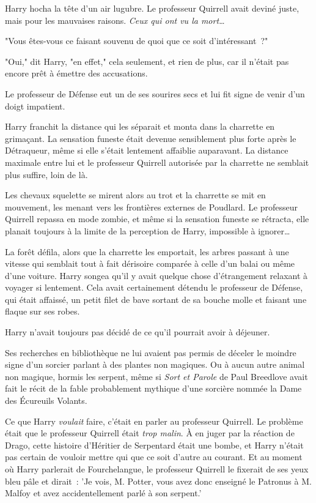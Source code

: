 Harry hocha la tête d'un air lugubre. Le professeur Quirrell avait deviné juste, mais pour les mauvaises raisons. \emph{Ceux qui ont vu la mort…}

"Vous êtes-vous ce faisant souvenu de quoi que ce soit d'intéressant~?"

"Oui," dit Harry, "en effet," cela seulement, et rien de plus, car il n'était pas encore prêt à émettre des accusations.

Le professeur de Défense eut un de ses sourires secs et lui fit signe de venir d'un doigt impatient.

Harry franchit la distance qui les séparait et monta dans la charrette en grimaçant. La sensation funeste était devenue sensiblement plus forte après le Détraqueur, même si elle s'était lentement affaiblie auparavant. La distance maximale entre lui et le professeur Quirrell autorisée par la charrette ne semblait plus suffire, loin de là.

Les chevaux squelette se mirent alors au trot et la charrette se mit en mouvement, les menant vers les frontières externes de Poudlard. Le professeur Quirrell repassa en mode zombie, et même si la sensation funeste se rétracta, elle planait toujours à la limite de la perception de Harry, impossible à ignorer…

La forêt défila, alors que la charrette les emportait, les arbres passant à une vitesse qui semblait tout à fait dérisoire comparée à celle d'un balai ou même d'une voiture. Harry songea qu'il y avait quelque chose d'étrangement relaxant à voyager si lentement. Cela avait certainement détendu le professeur de Défense, qui était affaissé, un petit filet de bave sortant de sa bouche molle et faisant une flaque sur ses robes.

Harry n'avait toujours pas décidé de ce qu'il pourrait avoir à déjeuner.

Ses recherches en bibliothèque ne lui avaient pas permis de déceler le moindre signe d'un sorcier parlant à des plantes non magiques. Ou à aucun autre animal non magique, hormis les serpent, même si \emph{Sort et Parole} de Paul Breedlove avait fait le récit de la fable probablement mythique d'une sorcière nommée la Dame des Écureuils Volants.

Ce que Harry \emph{voulait} faire, c'était en parler au professeur Quirrell. Le problème était que le professeur Quirrell était \emph{trop malin}. À en juger par la réaction de Drago, cette histoire d'Héritier de Serpentard était une bombe, et Harry n'était pas certain de vouloir mettre qui que ce soit d'autre au courant. Et au moment où Harry parlerait de Fourchelangue, le professeur Quirrell le fixerait de ses yeux bleu pâle et dirait~: 'Je vois, M. Potter, vous avez donc enseigné le Patronus à M. Malfoy et avez accidentellement parlé à son serpent.'

